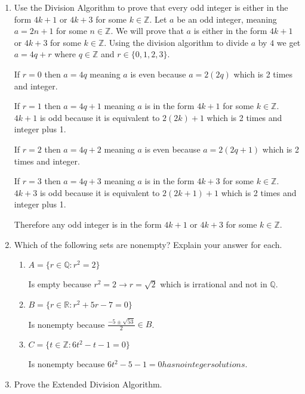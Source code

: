 \documentclass{article}
\begin{document}
\begin{enumerate}
\begin{enumerate}
    \end{enumerate}
    
    \item Use the Division Algorithm to prove that every odd integer is either in the form $4k+1$ or $4k+3$ for some $k \in \mathbb{Z}$.
    Let $a$ be an odd integer, meaning $a=2n+1$ for some $n \in \mathbb{Z}$. We will prove that $a$ is either in the form $4k+1$ or $4k+3$ for some $k \in \mathbb{Z}$.
    Using the division algorithm to divide $a$ by $4$ we get $a=4q+r$ where $q \in \mathbb{Z}$ and $r \in \{0,1,2,3\}$.
    
    If $r=0$ then $a=4q$ meaning $a$ is even because $a=2(2q)$ which is 2 times and integer.

    If $r=1$ then $a=4q+1$ meaning $a$ is in the form $4k+1$ for some $k \in \mathbb{Z}$. $4k+1$ is odd because it is equivalent to $2(2k)+1$ which is 2 times and integer plus 1.

    If $r=2$ then $a=4q+2$ meaning $a$ is even because $a=2(2q+1)$ which is 2 times and integer.

    If $r=3$ then $a=4q+3$ meaning $a$ is in the form $4k+3$ for some $k \in \mathbb{Z}$. $4k+3$ is odd because it is equivalent to $2(2k+1)+1$ which is 2 times and integer plus 1.

    Therefore any odd integer is in the form $4k+1$ or $4k+3$ for some $k \in \mathbb{Z}$.


    \item Which of the following sets are nonempty? Explain your answer for each.

    \begin{enumerate}
        \item $A = \{ r \in \mathbb{Q} \colon r^2 = 2 \}$
        
        Is empty because $r^2 = 2 \rightarrow r = \sqrt{2}$ which is irrational and not in $\mathbb{Q}$.
        \item $B = \{ r \in \mathbb{R} \colon r^2 + 5r - 7 = 0 \}$
        
        Is nonempty because $\frac{-5 \pm \sqrt{53}}{2} \in B$.
        \item $C = \{ t \in \mathbb{Z} \colon 6t^2 - t - 1 = 0 \}$
        
        Is nonempty because $6t^2-5-1=0 has no integer solutions$.
    \end{enumerate}

    \item Prove the Extended Division Algorithm.


\end{enumerate}
\end{document}
